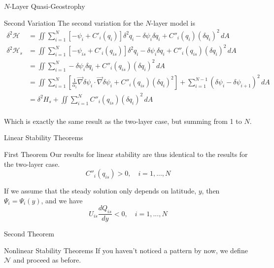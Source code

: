 \documentclass[12pt]{article}
\begin{document}
\begin{section}{$N$-Layer Quasi-Geostrophy}
    \begin{subsection}{Second Variation}
        The second variation for the $N$-layer model is
        \begin{align*}
            \delta^2 \mathcal{H} &= \iint \sum_{i=1}^N \left[ - \psi_i + C'_i(q_i) \right]  \delta^2 q_i  - \delta \psi_i \delta q_i +  C''_i(q_i) (\delta q_i)^2  \, dA \\
            \delta^2 \mathcal{H}_s &= \iint \sum_{i=1}^N \left[ - \psi_{is} + C'_i(q_{is}) \right]  \delta^2 q_i  - \delta \psi_i \delta q_i +  C''_i(q_{is}) (\delta q_i)^2  \, dA \\
            &= \iint \sum_{i=1}^N - \delta \psi_i \delta q_i +  C''_i(q_{is}) (\delta q_i)^2  \, dA \\
            &= \iint \sum_{i=1}^N \left[ \frac{1}{\alpha_i} \vec\nabla\delta\psi_i \cdot \vec\nabla\delta\psi_i + C''_i(q_{is}) (\delta q_i)^2 \right] + \sum_{i=1}^{N-1}(\delta\psi_i - \delta\psi_{i+1})^2 \, dA \\
            &= \delta^2 H_s + \iint \sum_{i=1}^N C''_i(q_{is})(\delta q_i)^2 \, dA \\
        \end{align*}

        Which is exactly the same result as the two-layer case, but summing from 1 to $N$.
    \end{subsection}

    \begin{subsection}{Linear Stability Theorems}
        \begin{subsubsection}{First Theorem}
            Our results for linear stability are thus identical to the results for the two-layer case.
            $$
            C''_i(q_{is}) > 0, \quad i=1,...,N
            $$

            If we assume that the steady solution only depends on latitude, $y$, then $\Psi_i = \Psi_i(y)$, and we have
            $$
            U_{is} \frac{d Q_{is}}{dy} < 0, \quad i=1,...,N
            $$
        \end{subsubsection}
        \begin{subsubsection}{Second Theorem}
        \end{subsubsection}
    \end{subsection}

    \begin{subsection}{Nonlinear Stability Theorems}
        If you haven't noticed a pattern by now, we define $\mathcal{N}$ and proceed as before.


\end{subsection}
\end{section}
\end{document}
